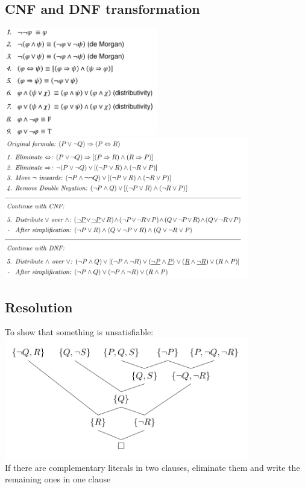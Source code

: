 \documentclass[conference]{styles/acmsiggraph}
\begin{document}
\subsection{CNF and DNF transformation}

\includegraphics[width=0.5\textwidth]{imgs/transform.png}
\includegraphics[width=0.8\textwidth]{imgs/transform-example.png}

\subsection{Resolution}


To show that something is unsatisfiable:\\
\includegraphics[width=0.8\textwidth]{imgs/resolution.png}\\
If there are complementary literals in two clauses, eliminate them and write the remaining ones in one clause
\end{document}

